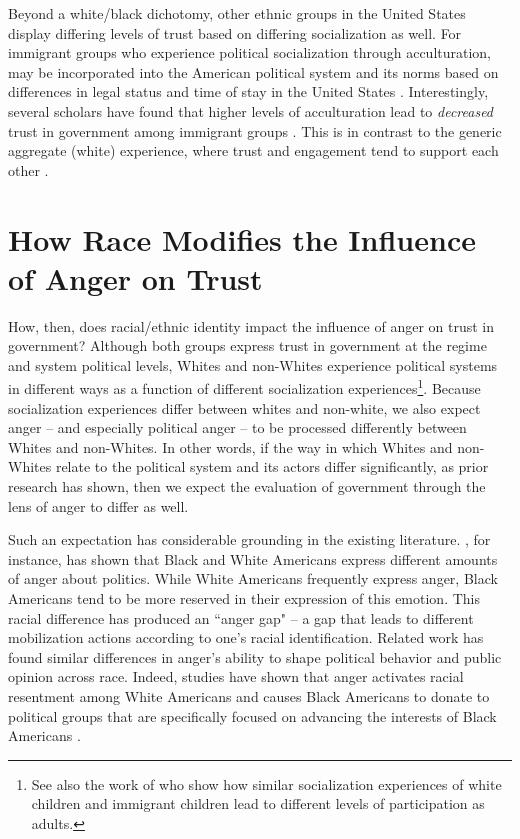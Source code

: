 \documentclass[12t, letterpaper]{article}
\begin{document}
Beyond a white/black dichotomy, other ethnic groups in the United States display differing levels of trust based on differing socialization as well. For immigrant groups who experience political socialization through acculturation, may be incorporated into the American political system and its norms based on differences in legal status and time of stay in the United States \citep{uslaner2003}. Interestingly, several scholars have found that higher levels of acculturation lead to \textit{decreased} trust in government among immigrant groups \citep{abrajano2010,michelson2001}. This is in contrast to the generic aggregate (white) experience, where trust and engagement tend to support each other \citep{uslaner2005}. 

\section{How Race Modifies the Influence of Anger on Trust}
\label{sec:theory}


How, then, does racial/ethnic identity impact the influence of anger on trust in government? Although both groups express trust in government at the regime and system political levels, Whites and non-Whites experience political systems in different ways as a function of different socialization experiences\footnote{See also the work of \citet{humphries2013} who show how similar socialization experiences of white children and immigrant children lead to different levels of participation as adults.}. Because socialization experiences differ between whites and non-white, we also expect anger -- and especially political anger -- to be processed differently between Whites and non-Whites. In other words, if the way in which Whites and non-Whites relate to the political system and its actors differ significantly, as prior research has shown, then we expect the evaluation of government through the lens of anger to differ as well.

Such an expectation has considerable grounding in the existing literature. \citet{phoenix2019}, for instance, has shown that Black and White Americans express different amounts of anger about politics. While White Americans frequently express anger, Black Americans tend to be more reserved in their expression of this emotion. This racial difference has produced an ``anger gap" -- a gap that leads to different mobilization actions according to one's racial identification. Related work has found similar differences in anger's ability to shape political behavior and public opinion across race. Indeed, studies have shown that anger activates racial resentment among White Americans \citep{banks2014} and causes Black Americans to donate to political groups that are specifically focused on advancing the interests of Black Americans \citep{banks_white_mckenzie2019}.
\end{document}
